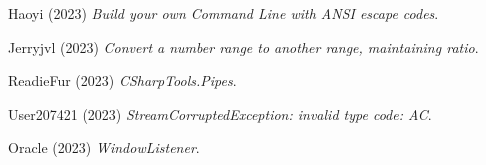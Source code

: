 \documentclass{COMPXXXX}
\begin{document}
% 
% 

\begin{thebibliography}{9} %

Haoyi (2023) \textit{Build your own Command Line with ANSI escape codes}.

Jerryjvl (2023) \textit{Convert a number range to another range, maintaining ratio}.

ReadieFur (2023) \textit{CSharpTools.Pipes}.

User207421 (2023) \textit{StreamCorruptedException: invalid type code: AC}.

Oracle (2023) \textit{WindowListener}.

\end{thebibliography}
\end{document}
